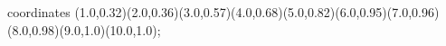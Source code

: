 					coordinates { (1.0,0.32)(2.0,0.36)(3.0,0.57)(4.0,0.68)(5.0,0.82)(6.0,0.95)(7.0,0.96)(8.0,0.98)(9.0,1.0)(10.0,1.0)};
